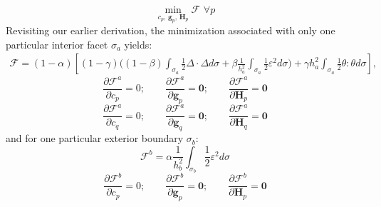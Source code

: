 \documentclass[11pt]{article} %
\begin{document}
\begin{equation}
	\min_{c_p, \, \mathbf{g}_p, \, \mathbf{H}_{p}} \mathcal{F} \, \, \forall p
\end{equation}
Revisiting our earlier derivation, the minimization associated with only one particular interior facet $\sigma_a$ yields:
\begin{eqnarray}
	\mathcal{F} = (1-\alpha) \left[ (1 - \gamma) \bigg( (1-\beta) \int_{\sigma_a} \frac{1}{2} \Delta \cdot \Delta d \sigma + \beta \frac{1}{h_a^2} \int_{\sigma_a} \frac{1}{2} \varepsilon^2 d \sigma \bigg) + \gamma h_a^2 \int_{\sigma_a} \frac{1}{2} \theta \colon \theta d \sigma \right] ,
\end{eqnarray}
\begin{equation}
	\frac{\partial \mathcal{F}^a}{\partial c_p} = 0; \qquad \frac{\partial \mathcal{F}^a}{\partial \mathbf{g}_p} = \mathbf{0}; \qquad \frac{\partial \mathcal{F}^a}{\partial \mathbf{H}_{p}} = \mathbf{0}
\end{equation}
\begin{equation}
	\frac{\partial \mathcal{F}^a}{\partial c_q} = 0; \qquad \frac{\partial \mathcal{F}^a}{\partial \mathbf{g}_q} = \mathbf{0}; \qquad \frac{\partial \mathcal{F}^a}{\partial \mathbf{H}_{q}} = \mathbf{0}
\end{equation}
and for one particular exterior boundary $\sigma_b$:
\begin{equation}
	\mathcal{F}^b = \alpha \frac{1}{h_b^2} \int_{\sigma_b} \frac{1}{2} \varepsilon^2 d \sigma
\end{equation}
\begin{equation}
	\frac{\partial \mathcal{F}^b}{\partial c_p} = 0; \qquad \frac{\partial \mathcal{F}^b}{\partial \mathbf{g}_p} = \mathbf{0}; \qquad \frac{\partial \mathcal{F}^b}{\partial \mathbf{H}_{p}} = \mathbf{0}
\end{equation}
\end{document}
